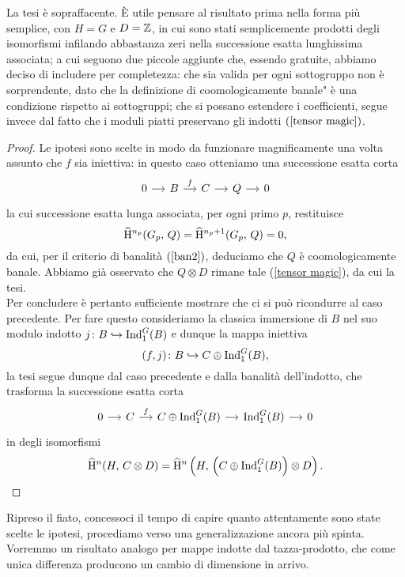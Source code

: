 La tesi è sopraffacente. È utile pensare al risultato prima nella forma più semplice, con $ H=G $ e $ D = \mathbb{Z} $, in cui sono stati semplicemente prodotti degli isomorfismi infilando abbastanza zeri nella successione esatta lunghissima associata; a cui seguono due piccole aggiunte che, essendo gratuite, abbiamo deciso di includere per completezza: che sia valida per ogni sottogruppo non è sorprendente, dato che la definizione di \leftquote coomologicamente banale" è una condizione rispetto ai sottogruppi; che si possano estendere i coefficienti, segue invece dal fatto che i moduli piatti preservano gli indotti $ (\ref{tensor magic}) $. 

\begin{proof}
	Le ipotesi sono scelte in modo da funzionare magnificamente una volta assunto che $ f $ sia iniettiva: in questo caso otteniamo una successione esatta corta
	\[ \begin{tikzcd}[column sep = small]
	0 \rar
	& B \rar["f"]
	& C \rar
	& Q \rar
	& 0 \end{tikzcd} \]
	la cui successione esatta lunga associata, per ogni primo $ p $, restituisce
	\[ \operatorname{\widehat{H}^{\mathnormal{n_p}}}(G_p, \, Q) = \operatorname{\widehat{H}^{\mathnormal{n_p}+1}}(G_p, \, Q)=0, \]
	da cui, per il criterio di banalità $ (\ref{ban2}) $, deduciamo che $ Q $ è coomologicamente banale. Abbiamo già osservato che $ Q \otimes D $ rimane tale (\ref{tensor magic}), da cui la tesi. \\
	
	Per concludere è pertanto sufficiente mostrare che  ci si può ricondurre al caso precedente. Per fare questo consideriamo la classica immersione di $ B $ nel suo modulo indotto $ j \colon B \hookrightarrow \operatorname{Ind}_1^G(B) $ e dunque la mappa iniettiva
	\[ (f, j)\colon B \hookrightarrow C \oplus \operatorname{Ind}_1^G(B), \]
	la tesi segue dunque dal caso precedente e dalla banalità dell'indotto, che trasforma la successione esatta corta
	\[ \begin{tikzcd}[column sep = small]
	0 \rar
	& C \rar["f"]
	& C \oplus \Ind_1^G(B) \rar
	& \Ind_1^G(B) \rar
	& 0 \end{tikzcd} \]
	in degli isomorfismi
	\[ \operatorname{\widehat{H}^{\mathnormal{n}}}(H, \, C \otimes D ) = \operatorname{\widehat{H}^{\mathnormal{n}}} \left(H, \, \left(C \oplus \operatorname{Ind}_1^G(B)\right) \otimes D \right).  \qedhere \]
\end{proof}

Ripreso il fiato, concessoci il tempo di capire quanto attentamente sono state scelte le ipotesi, procediamo verso una generalizzazione ancora più spinta. Vorremmo un risultato analogo per mappe indotte dal tazza-prodotto, che come unica differenza producono un cambio di dimensione in arrivo.

